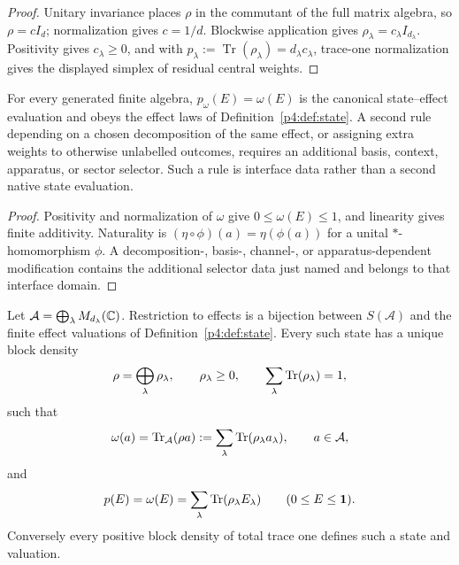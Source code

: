 \documentclass[12pt,a4paper]{article}
\begin{document}
\begin{proof}
Unitary invariance places \(\rho\) in the commutant of the full matrix
algebra, so \(\rho=cI_d\); normalization gives \(c=1/d\).  Blockwise
application gives \(\rho_\lambda=c_\lambda I_{d_\lambda}\).  Positivity gives
\(c_\lambda\ge0\), and with
\(p_\lambda:=\operatorname{Tr}(\rho_\lambda)=d_\lambda c_\lambda\), trace-one
normalization gives the displayed simplex of residual central weights.
\end{proof}

\begin{proposition}
\label{p4:prop:no-insertion-finite-readout-uniqueness}
For every generated finite algebra, \(p_\omega(E)=\omega(E)\) is the canonical
state--effect evaluation and obeys the effect laws of
Definition~\ref{p4:def:state}.  A second rule depending on a chosen
decomposition of the same effect, or assigning extra weights to otherwise
unlabelled outcomes, requires an additional basis, context, apparatus, or
sector selector.  Such a rule is interface data rather than a second native
state evaluation.
\end{proposition}


\begin{proof}
Positivity and normalization of \(\omega\) give \(0\le\omega(E)\le1\), and
linearity gives finite additivity.  Naturality is
\((\eta\circ\phi)(a)=\eta(\phi(a))\) for a unital \(*\)-homomorphism \(\phi\).
A decomposition-, basis-, channel-, or apparatus-dependent modification
contains the additional selector data just named and belongs to that
interface domain.
\end{proof}


\begin{theorem}
\label{p4:thm:density-matrix}
Let \(\mathcal A=\bigoplus_\lambda M_{d_\lambda}(\mathbb{C})\).  Restriction to
effects is a bijection between \(S(\mathcal A)\) and the finite effect
valuations of Definition~\ref{p4:def:state}.  Every such state has a unique
block density
\[
 \rho=\bigoplus_\lambda\rho_\lambda,
 \qquad \rho_\lambda\ge0,
 \qquad \sum_\lambda\operatorname{Tr}(\rho_\lambda)=1,
\]
such that
\begin{equation}
\label{p4:eq:omega-trace}
 \omega(a)=\operatorname{Tr}_{\mathcal A}(\rho a)
 :=\sum_\lambda\operatorname{Tr}(\rho_\lambda a_\lambda),
 \qquad a\in\mathcal A,
\end{equation}
and
\[
 p(E)=\omega(E)
 =\sum_\lambda\operatorname{Tr}(\rho_\lambda E_\lambda)
\qquad
(0\le E\le\mathbf{1}).
\]
Conversely every positive block density of total trace one defines such a
state and valuation.
\end{theorem}
\end{document}
